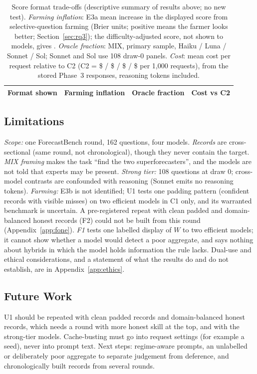 \documentclass[11pt,letterpaper]{article}
\begin{document}
\begin{table}[t]
\centering\small
\caption{Score format trade-offs (descriptive summary of results above; no new test). \emph{Farming inflation}: E3a
mean increase in the displayed score from selective-question farming (Brier units; positive means the farmer looks
better; Section~\ref{sec:rq3}); the difficulty-adjusted score, not shown to models, gives \inflFe. \emph{Oracle
fraction}: MIX, primary sample, Haiku / Luna / Sonnet / Sol; Sonnet and Sol use 108 draw-0 panels. \emph{Cost}: mean
cost per request relative to C2 (C2 = \$\costCtwoHaiku{} / \$\costCtwoLuna{} / \$\costCtwoSonnet{} /
\$\costCtwoSol{} per 1,000 requests), from the stored Phase~3 responses, reasoning tokens included.}
\label{tab:formats}
\setlength{\tabcolsep}{4pt}
\begin{tabular}{@{}llll@{}}
\toprule
Format shown & Farming inflation & Oracle fraction & Cost vs C2 \\
\midrule

\end{tabular}
\end{table}

\subsection*{Limitations}
\emph{Scope:} one ForecastBench round, 162 questions, four models. \emph{Records} are cross-sectional (same round,
not chronological), though they never contain the target. \emph{MIX framing} makes the task ``find the two
superforecasters'', and the models are not told that experts may be present. \emph{Strong tier:} 108 questions at
draw 0; cross-model contrasts are confounded with reasoning (Sonnet emits no reasoning tokens). \emph{Farming:} E3b is not identified; U1 tests one padding pattern (confident records with visible misses) on two
efficient models in C1 only, and its warranted benchmark is uncertain. A pre-registered repeat with clean padded and
domain-balanced honest records (F2) could not be built from this round (Appendix~\ref{app:fone}). \emph{F1} tests one
labelled display of $W$ to two efficient models; it cannot show whether a model would detect a poor aggregate, and says nothing about hybrids in which the
model holds information the rule lacks. Dual-use and ethical considerations, and
a statement of what the results do and do not establish, are in Appendix~\ref{app:ethics}.

\subsection*{Future Work} U1 should be repeated with clean padded records and domain-balanced honest records, which
needs a round with more honest skill at the top, and with the strong-tier models. Cache-busting must go into request
settings (for example a seed), never into prompt text. Next steps: regime-aware prompts, an unlabelled or deliberately
poor aggregate to separate judgement from deference, and chronologically built records from several rounds.
\end{document}
